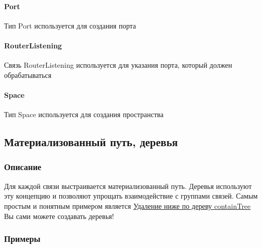 \documentclass{article}
\begin{document}
\paragraph*{Port}\hypertarget{Core.Port.Description}{}
Тип Port используется для создания порта
\paragraph*{RouterListening}\hypertarget{Core.RouterListening.Description}{}
Связь RouterListening используется для
указания порта, который должен обрабатываться
\paragraph*{Space}\hypertarget{Core.Space.Description}{}
Тип Space используется для создания пространства

\subsection{Материализованный путь, деревья}
\subsubsection{Описание}
Для каждой связи выстраивается материализованный путь. Деревья используют эту
концепцию и позволяют упрощать взаимодействие с группами связей.
Самым простым и понятным примером является
\hyperlink{containTree.Deletion.Example}{Удаление ниже по дереву containTree}
Вы сами можете создавать деревья!
\subsubsection{Примеры}
\end{document}

